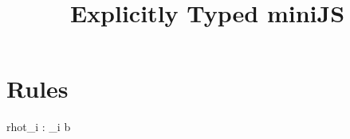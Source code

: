 \documentclass[nocopyrightspace,onecolumn]{sigplanconf}
\begin{document}
\title{Explicitly Typed miniJS}
\authorinfo{}{}{}
\date{}
\maketitle

\section{Rules}
\newcommand{\env}{rho}

\infrule
{ \env t_i : _i }
{ b }
\end{document}
